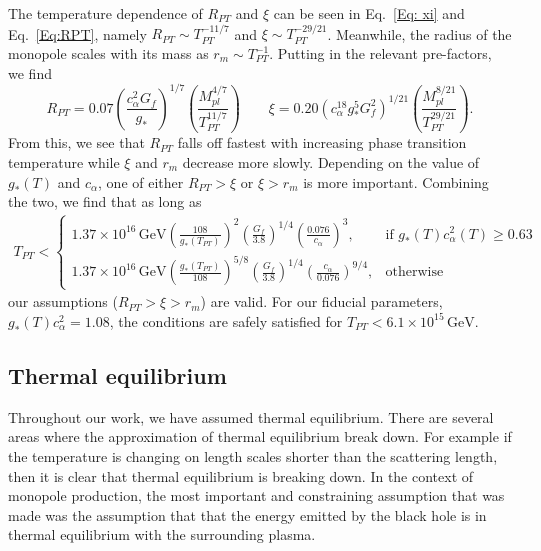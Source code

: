 \documentclass[superscriptaddress,groupedaddress,nofootnoteinbib,11pt]{article}
\newcommand\eea{\end{eqnarray}}
\newcommand\bea{\begin{eqnarray}}
\newcommand{\mpl}{M_{pl}}
\def\l{\left(}
\def\r{\right)}
\begin{document}
The temperature dependence of $R_{PT}$ and $\xi$ can be seen in Eq.~\ref{Eq: xi} and Eq.~\ref{Eq:RPT}, namely $R_{PT}\sim T_{PT}^{-11/7}$ and $\xi\sim T_{PT}^{-29/21}$.  Meanwhile, the radius of the monopole scales with its mass as $r_m\sim T_{PT}^{-1}$. 
Putting in the relevant pre-factors, we find
\begin{equation}
    R_{PT}=0.07\l{\frac{c_{\alpha} ^2 G_f }{g_* }}\r^{1/7}\l\frac{\mpl^{4/7}}{T_{PT}^{11/7}}\r \qquad \xi = 0.20\l c_{\alpha}^{18}g_*^5 G_f^2\r^{1/21} \l\frac{ \mpl^{8/21}}{T_{PT}^{29/21}}\r .
\end{equation}
From this, we see that $R_{PT}$ falls off fastest with increasing phase transition temperature while $\xi$ and $r_m$ decrease more slowly.  
Depending on the value of $g_*(T)$ and $c_{\alpha}$,  one of either $R_{PT} > \xi$ or $\xi > r_m$ is more important. Combining the two, we find that as long as 
\bea
    T_{PT}< 
\begin{cases}
    1.37\times 10^{16} \, \text{GeV} \l\frac{108}{g_*(T_{PT})}\r^2 \l\frac{G_f}{3.8}\r^{1/4}\l\frac{0.076}{c_{\alpha}}\r^{3},& \text{if } g_*(T)c_{\alpha}^2(T)\geq 0.63\\
    1.37\times 10^{16} \, \text{GeV} \l\frac{g_*(T_{PT})}{108}\r^{5/8} \l\frac{G_f}{3.8}\r^{1/4}\l \frac{c_{\alpha}}{0.076} \r^{9/4},              & \text{otherwise}
\end{cases}
\eea
our assumptions ($R_{PT} > \xi > r_m$) are valid. For our fiducial parameters, $g_*(T)c_{\alpha}^2=1.08$, the conditions are safely satisfied for $T_{PT}< 6.1\times 10^{15} \, \text{GeV}.$



\subsection{Thermal equilibrium}




Throughout our work, we have assumed thermal equilibrium.  There are several areas where the approximation of thermal equilibrium break down.  For example if the temperature is changing on length scales shorter than the scattering length, then it is clear that thermal equilibrium is breaking down.  In the context of monopole production, the most important and constraining assumption that was made was the assumption that that the energy emitted by the black hole is in thermal equilibrium with the surrounding plasma. 
\end{document}
